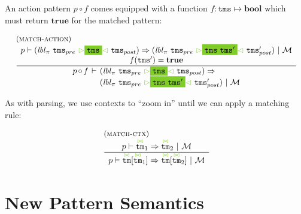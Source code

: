 \documentclass{article}
\makeatletter
\newcommand{\rulename}{\textsc}
\newcommand{\irule}[3]{\begin{array}{l}{~\small\mbox{(\rulename{#1})}}\\\;\frac{\begin{array}{c}#2\end{array}}{\begin{array}{l}#3\end{array}}\end{array}}
\newcommand{\cursorColor}{LimeGreen}
\newcommand{\lbl}{\ensuremath{\mathit{lbl}}}
\newcommand{\tm}{\ensuremath{\mathtt{tm}}}
\newcommand{\tms}{\ensuremath{\mathtt{tms}}}
\newcommand{\Tmc}{\ensuremath{\overset{ \textcolor{\cursorColor}{\bowtie}}{\tm}}}
\newcommand{\mstart}{\ensuremath{\textcolor{\cursorColor}{\rhd}}}
\newcommand{\mend}{\ensuremath{\textcolor{\cursorColor}{\lhd}}}
\newcommand{\bindings}{\ensuremath{\mathcal{M}}}
\newcommand{\select}[1]{\mstart\colorbox{\cursorColor}{$#1$}\mend}
\newcommand{\matches}[4]{\ensuremath{#1 \vdash #2 \Rightarrow #3 ~|~ #4}}
\newcommand{\xmatches}[4]{\ensuremath{
    \begin{array}{r@{\hspace{4pt}}c@{\hspace{4pt}}l}%
      #1 & \vdash & #2 \Rightarrow\\
         &        & #3 ~|~ #4
    \end{array}}}
\newcommand{\paction}[2]{\ensuremath{#1\mathop{\circ} #2}}
\makeatother
\begin{document}
An action pattern $\paction{p}{f}$ comes equipped with a function
$f : \tms \mapsto \mathbf{bool}$ which must return $\mathbf{true}$
for the matched pattern:

\[
  \begin{array}{c}
    \irule{match-action}{
    \matches{p}{(\lbl_\pi~\tms_{pre}~\select{\tms}~\tms_{post})}
               {(\lbl_\pi~\tms_{pre}~\select{\tms~\tms'}~\tms'_{post})}{\bindings}\\
    f(\tms') = \mathbf{true}
    }{
    \xmatches{\paction{p}{f}}
    {(\lbl_\pi~\tms_{pre}~\select{\tms}~\tms_{post})}
    {(\lbl_\pi~\tms_{pre}~\select{\tms~\tms'}~\tms'_{post})}{\bindings}
    }
  \end{array}
\]


As with parsing, we use contexts to ``zoom in'' until we can apply
a matching rule:

\[
  \begin{array}{c}
    \irule{match-ctx}{
    \matches{p}{\Tmc_1}{\Tmc_2}{\bindings}
    }{
    \matches{p}{\Tmc[\Tmc_1]}{\Tmc[\Tmc_2]}{\bindings}
    }
  \end{array}
\]

\section{New Pattern Semantics}
\end{document}
